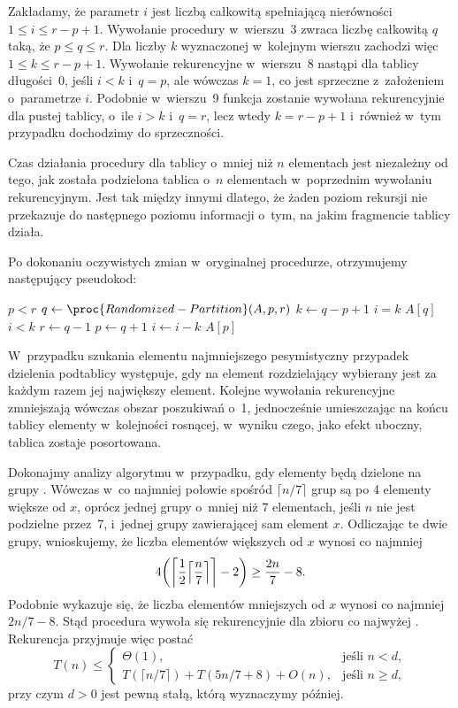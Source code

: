 \exercise %
Zakładamy, że parametr $i$ jest liczbą całkowitą spełniającą nierówności $1\le i\le r-p+1$.
Wywołanie procedury  w~wierszu~3 zwraca liczbę całkowitą $q$ taką, że $p\le q\le r$.
Dla liczby $k$ wyznaczonej w~kolejnym wierszu zachodzi więc $1\le k\le r-p+1$.
Wywołanie rekurencyjne w~wierszu~8 nastąpi dla tablicy długości~0, jeśli $i<k$ i~$q=p$, ale wówczas $k=1$, co jest sprzeczne z~założeniem o~parametrze $i$.
Podobnie w~wierszu~9 funkcja zostanie wywołana rekurencyjnie dla pustej tablicy, o~ile $i>k$ i~$q=r$, lecz wtedy $k=r-p+1$ i~również w~tym przypadku dochodzimy do sprzeczności.

\exercise %
Czas działania procedury  dla tablicy o~mniej niż $n$ elementach jest niezależny od tego, jak została podzielona tablica o~$n$ elementach w~poprzednim wywołaniu rekurencyjnym.
Jest tak między innymi dlatego, że żaden poziom rekursji nie przekazuje do następnego poziomu informacji o~tym, na jakim fragmencie tablicy działa.

\exercise %
Po dokonaniu oczywistych zmian w~oryginalnej procedurze, otrzymujemy następujący pseudokod:
\begin{codebox}
\li	\While $p<r$
\li		\Do
			$q\gets\proc{Randomized-Partition}(A,p,r)$
\li			$k\gets q-p+1$
\li			\If $i=k$
\li				\Then \Return $A[q]$
				\End
\li			\If $i<k$
\li				\Then $r\gets q-1$
\li				\Else
					$p\gets q+1$
\li					$i\gets i-k$
				\End
		\End
\li	\Return $A[p]$
\end{codebox}

\exercise %
W~przypadku szukania elementu najmniejszego pesymistyczny przypadek dzielenia podtablicy występuje, gdy na element rozdzielający wybierany jest za każdym razem jej największy element.
Kolejne wywołania rekurencyjne zmniejszają wówczas obszar poszukiwań o~1, jednocześnie umieszczając na końcu tablicy elementy w~kolejności rosnącej, w~wyniku czego, jako efekt uboczny, tablica zostaje posortowana.


\exercise %
Dokonajmy analizy algorytmu  w~przypadku, gdy elementy będą dzielone na grupy .
Wówczas w~co najmniej połowie spośród $\lceil n/7\rceil$ grup są po 4 elementy większe od $x$, oprócz jednej grupy o~mniej niż 7 elementach, jeśli $n$ nie jest podzielne przez~7, i~jednej grupy zawierającej sam element $x$.
Odliczając te dwie grupy, wnioskujemy, że liczba elementów większych od $x$ wynosi co najmniej
\[
	4\biggl(\biggl\lceil\frac{1}{2}\Bigl\lceil\frac{n}{7}\Bigr\rceil\biggr\rceil-2\biggr) \ge \frac{2n}{7}-8.
\]
Podobnie wykazuje się, że liczba elementów mniejszych od $x$ wynosi co najmniej $2n/7-8$.
Stąd procedura wywoła się rekurencyjnie dla zbioru co najwyżej .
Rekurencja przyjmuje więc postać
\[
	T(n) \le \begin{cases}
		\Theta(1), & \text{jeśli $n<d$}, \\
		T(\lceil n/7\rceil)+T(5n/7+8)+O(n), & \text{jeśli $n\ge d$},
	\end{cases}
\]
przy czym $d>0$ jest pewną stałą, którą wyznaczymy później.

